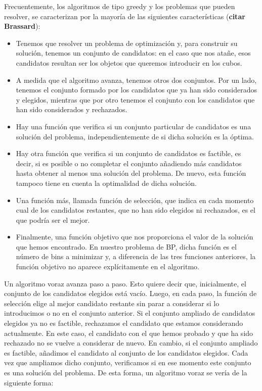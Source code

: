 \documentclass[a4paper, 12pt, oneside]{book}
\begin{document}
	Frecuentemente, los algoritmos de tipo greedy y los problemas que pueden resolver, se caracterizan por la mayor\'ia de las siguientes caracter\'isticas (\textbf{citar Brassard}):
	
	\begin{itemize}
		\item Tenemos que resolver un problema de optimizaci\'on y, para construir su soluci\'on, tenemos un conjunto de candidatos: en el caso que nos ata\~{n}e, esos candidatos resultan ser los objetos que queremos introducir en los cubos.
		\item A medida que el algoritmo avanza, tenemos otros dos conjuntos. Por un lado, tenemos el conjunto formado por los candidatos que ya han sido considerados y elegidos, mientras que por otro tenemos el conjunto con los candidatos que han sido considerados y rechazados.
		\item Hay una funci\'on que verifica si un conjunto particular de candidatos es una soluci\'on del problema, independientemente de si dicha soluci\'on es la \'optima.
		\item Hay otra funci\'on que verifica si un conjunto de candidatos es factible, es decir, si es posible o no completar el conjunto a\~{n}adiendo m\'as candidatos hasta obtener al menos una soluci\'on del problema. De nuevo, esta funci\'on tampoco tiene en cuenta la optimalidad de dicha soluci\'on.
		\item Una funci\'on m\'as, llamada funci\'on de selecci\'on, que indica en cada momento cual de los candidatos restantes, que no han sido elegidos ni rechazados, es el que podr\'ia ser el mejor.
		\item Finalmente, una funci\'on objetivo que nos proporciona el valor de la soluci\'on que hemos encontrado. En nuestro problema de BP, dicha funci\'on
		es el n\'umero de bins a minimizar y, a diferencia de las tres funciones
		anteriores, la funci\'on objetivo no aparece expl\'icitamente en el algoritmo.
	\end{itemize}
	
	Un algoritmo voraz avanza paso a paso. Esto quiere decir que, inicialmente,
	el conjunto de los candidatos elegidos est\'a vac\'io. Luego, en cada paso, la funci\'on de selecci\'on elige al mejor candidato restante sin parar a considerar si lo introducimos o no en el conjunto anterior. Si el conjunto ampliado de candidatos elegidos ya no es factible, rechazamos el candidato que estamos considerando actualmente. En este caso, el candidato con el que hemos probado y que ha sido rechazado no se vuelve a considerar de nuevo. En cambio, si el conjunto ampliado es factible, a\~{n}adimos el candidato al conjunto de los candidatos elegidos. Cada vez que ampliamos dicho conjunto, verificamos si en ese momento este conjunto es una soluci\'on del problema. De esta forma, un algoritmo voraz se ver\'ia de la siguiente forma:
	\\
	
\end{document}
